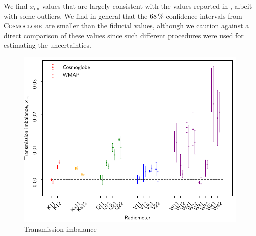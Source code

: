 \documentclass[twocolumn]{../../common/aa}
\newcommand{\cosmoglobe}{\textsc{Cosmoglobe}}
\begin{document}
We find $x_\mathrm{im}$ values that are largely consistent with the values reported in \citet{bennett2012}, albeit with some outliers. We find in general that the 68\,\% confidence intervals from \cosmoglobe\ are smaller than the fiducial values, although we caution against a direct comparison of these values since such different procedures were used for estimating the uncertainties.

\begin{figure}[t]
  	\centering
	\includegraphics[width=\linewidth]{figures/x_im_CG_v1.pdf}
	\caption{Transmission imbalance}
	\label{fig:x_im}
\end{figure}
\end{document}
